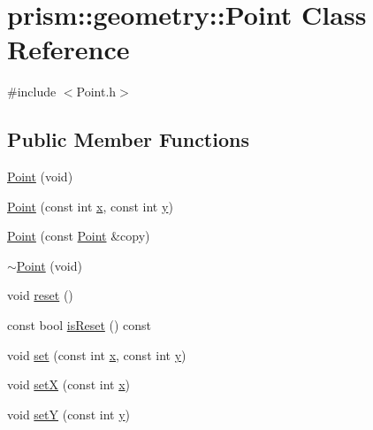 \hypertarget{classprism_1_1geometry_1_1_point}{}\section{prism\+:\+:geometry\+:\+:Point Class Reference}
\label{classprism_1_1geometry_1_1_point}


{\ttfamily \#include $<$Point.\+h$>$}

\subsection*{Public Member Functions}
\begin{DoxyCompactItemize}
\item 
\hyperlink{classprism_1_1geometry_1_1_point_a416c0202ee56cd8a3d7ef03584aef07a}{Point} (void)
\item 
\hyperlink{classprism_1_1geometry_1_1_point_a0fe5c1de85299f47a1893ee342a9d212}{Point} (const int \hyperlink{classprism_1_1geometry_1_1_point_ae96742a93b0912b2472afded04ec9321}{x}, const int \hyperlink{classprism_1_1geometry_1_1_point_a17446c41c039a445a82ef662f7d26312}{y})
\item 
\hyperlink{classprism_1_1geometry_1_1_point_ae305fa105b84a09a5975bcd4efbbb72a}{Point} (const \hyperlink{classprism_1_1geometry_1_1_point}{Point} \&copy)
\item 
\hyperlink{classprism_1_1geometry_1_1_point_a79e9ad9436503b1329c0f079c9bd44d3}{$\sim$\+Point} (void)
\item 
void \hyperlink{classprism_1_1geometry_1_1_point_a22ddfdc970d4a49687e790b9440070b6}{reset} ()
\item 
const bool \hyperlink{classprism_1_1geometry_1_1_point_ac44fa2c611a2a8a6d06674179237d341}{is\+Reset} () const 
\item 
void \hyperlink{classprism_1_1geometry_1_1_point_a6289b4fb0a97cf5dc9b794d140462d2f}{set} (const int \hyperlink{classprism_1_1geometry_1_1_point_ae96742a93b0912b2472afded04ec9321}{x}, const int \hyperlink{classprism_1_1geometry_1_1_point_a17446c41c039a445a82ef662f7d26312}{y})
\item 
void \hyperlink{classprism_1_1geometry_1_1_point_acee13a061255a7af58899969619cdca1}{setX} (const int \hyperlink{classprism_1_1geometry_1_1_point_ae96742a93b0912b2472afded04ec9321}{x})
\item 
void \hyperlink{classprism_1_1geometry_1_1_point_af180b7029f080d56272273eb9f8e8ab9}{setY} (const int \hyperlink{classprism_1_1geometry_1_1_point_a17446c41c039a445a82ef662f7d26312}{y})

\end{DoxyCompactItemize}
